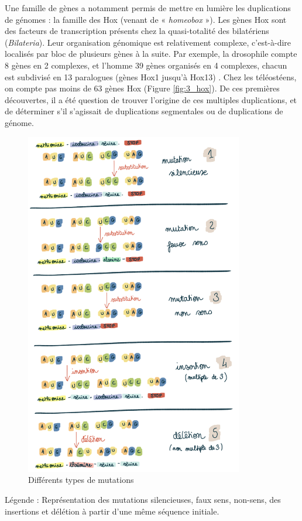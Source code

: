 \par Une famille de gènes a notamment permis de mettre en lumière les duplications de génomes : la famille des Hox (venant de « \textit{homeobox} »). Les gènes Hox sont des facteurs de transcription présents chez la quasi-totalité des bilatériens (\textit{Bilateria}). Leur organisation génomique est relativement complexe, c’est-à-dire localisés par bloc de plusieurs gènes à la suite. Par exemple, la drosophile compte 8 gènes en 2 complexes, et l’homme 39 gènes organisés en 4 complexes, chacun est subdivisé en 13 paralogues (gènes Hox1 jusqu’à Hox13) \parencite{hoegg_hox_2005, meyer_vertebrate_1999, rux_hox_2017}. Chez les téléostéens, on compte pas moins de 63 gènes Hox \parencite{meyer_vertebrate_1999, stellwag_hox_1999} (Figure \ref{fig:3_hox}). De ces premières découvertes, il a été question de trouver l’origine de ces multiples duplications, et de déterminer s’il s’agissait de duplications segmentales ou de duplications de génome. 

\begin{figure}[H]
    \centering
    \includegraphics[width=0.85\textwidth]{figures/corps/figure2.png}
    \caption{Différents types de mutations}
    \label{fig:2_mutations}
\end{figure}
Légende : Représentation des mutations silencieuses, faux sens, non-sens, des insertions et délétion à partir d’une même séquence initiale. \newpage


